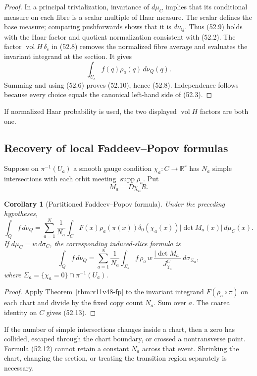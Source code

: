 \documentclass[11pt]{article}
\newtheorem{corollary}[theorem]{Corollary}
\begin{document}
\begin{proof}
In a principal trivialization, invariance of \(d\mu_C\) implies that
its conditional measure on each fibre is a scalar multiple of Haar
measure.  The scalar defines the base measure; comparing pushforwards
shows that it is \(d\nu_Q\).  Thus (52.9) holds with the Haar factor
and quotient normalization consistent with (52.2).  The factor
\(\operatorname{vol}H\,\delta_e\) in (52.8) removes the normalized
fibre average and evaluates the invariant integrand at the section.
It gives
\[
 \int_{U_a}f(q)\rho_a(q)\,d\nu_Q(q).
\]
Summing and using (52.6) proves (52.10), hence (52.8).
Independence follows because every choice equals the canonical
left-hand side of (52.3).
\end{proof}

If normalized Haar probability is used, the two displayed
\(\operatorname{vol}H\) factors are both one.

\subsection{Recovery of local Faddeev--Popov formulas}

Suppose on \(\pi^{-1}(U_a)\) a smooth gauge condition
\(\chi_a:C\to\mathbb R^r\) has \(N_a\) simple intersections with each
orbit meeting \(\operatorname{supp}\rho_a\).  Put
\[
                        M_a=D\chi_aR.                          \tag{52.11}
\]

\begin{corollary}[Partitioned Faddeev--Popov formula]
\label{cor:v11v52-fp}
Under the preceding hypotheses,
\[
 \boxed{
 \int_Qf\,d\nu_Q
 =\sum_{a=1}^N\frac1{N_a}
  \int_C F(x)\rho_a(\pi(x))
       \delta_0(\chi_a(x))|\det M_a(x)|\,d\mu_C(x).}          \tag{52.12}
\]
If \(d\mu_C=w\,d\sigma_C\), the corresponding induced-slice formula is
\[
 \int_Qf\,d\nu_Q
 =\sum_{a=1}^N\frac1{N_a}
  \int_{\Sigma_a}
  f\,\rho_a\,w\,
  \frac{|\det M_a|}{J_{\chi_a}^C}\,d\sigma_{\Sigma_a},        \tag{52.13}
\]
where \(\Sigma_a=\{\chi_a=0\}\cap\pi^{-1}(U_a)\).
\end{corollary}

\begin{proof}
Apply Theorem~\ref{thm:v11v48-fp} to the invariant integrand
\(F(\rho_a\circ\pi)\) on each chart and divide by the fixed copy count
\(N_a\).  Sum over \(a\).  The coarea identity on \(C\) gives
(52.13).
\end{proof}

\begin{warning}
\label{warn:v11v52-copies}
If the number of simple intersections changes inside a chart, then a
zero has collided, escaped through the chart boundary, or crossed a
nontransverse point.  Formula (52.12) cannot retain a constant
\(N_a\) across that event.  Shrinking the chart, changing the section,
or treating the transition region separately is necessary.
\end{warning}
\end{document}
